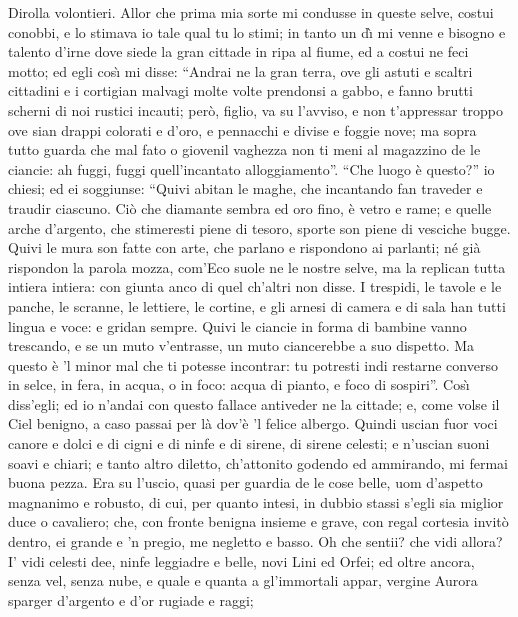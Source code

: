 \documentclass{book}
\begin{document}
	\5 Dirolla volontieri. Allor che prima
	mia sorte mi condusse in queste selve,
	costui conobbi, e lo stimava io tale
	qual tu lo stimi; in tanto un d\`{\i} mi venne
	e bisogno e talento d'irne dove
	siede la gran cittade in ripa al fiume,
	ed a costui ne feci motto; ed egli
	cos\`{\i} mi disse: ``Andrai ne la gran terra,
	ove gli astuti e scaltri cittadini
	e i cortigian malvagi molte volte
	prendonsi a gabbo, e fanno brutti scherni
	di noi rustici incauti; per\`o, figlio,
	va su l'avviso, e non t'appressar troppo
	ove sian drappi colorati e d'oro,
	e pennacchi e divise e foggie nove;
	ma sopra tutto guarda che mal fato
	o giovenil vaghezza non ti meni
	al magazzino de le ciancie: ah fuggi,
	fuggi quell'incantato alloggiamento''.
	``Che luogo \`e questo?'' io chiesi; ed ei soggiunse:
	``Quivi abitan le maghe, che incantando
	fan traveder e traudir ciascuno.
	Ci\`o che diamante sembra ed oro fino,
	\`e vetro e rame; e quelle arche d'argento,
	che stimeresti piene di tesoro,
	sporte son piene di vesciche bugge.
	Quivi le mura son fatte con arte,
	che parlano e rispondono ai parlanti;
	n\'e gi\`a rispondon la parola mozza,
	com'Eco suole ne le nostre selve,
	ma la replican tutta intiera intiera:
	con giunta anco di quel ch'altri non disse.
	I trespidi, le tavole e le panche,
	le scranne, le lettiere, le cortine,
	e gli arnesi di camera e di sala
	han tutti lingua e voce: e gridan sempre.
	Quivi le ciancie in forma di bambine
	vanno trescando, e se un muto v'entrasse,
	un muto ciancerebbe a suo dispetto.
	Ma questo \`e 'l minor mal che ti potesse
	incontrar: tu potresti indi restarne
	converso in selce, in fera, in acqua, o in foco:
	acqua di pianto, e foco di sospiri''.
	Cos\`{\i} diss'egli; ed io n'andai con questo
	fallace antiveder ne la cittade;
	e, come volse il Ciel benigno, a caso
	passai per l\`a dov'\`e 'l felice albergo.
	Quindi uscian fuor voci canore e dolci
	e di cigni e di ninfe e di sirene,
	di sirene celesti; e n'uscian suoni
	soavi e chiari; e tanto altro diletto,
	ch'attonito godendo ed ammirando,
	mi fermai buona pezza. Era su l'uscio,
	quasi per guardia de le cose belle,
	uom d'aspetto magnanimo e robusto,
	di cui, per quanto intesi, in dubbio stassi
	s'egli sia miglior duce o cavaliero;
	che, con fronte benigna insieme e grave,
	con regal cortesia invit\`o dentro,
	ei grande e 'n pregio, me negletto e basso.
	Oh che sentii? che vidi allora? I' vidi
	celesti dee, ninfe leggiadre e belle,
	novi Lini ed Orfei; ed oltre ancora,
	senza vel, senza nube, e quale e quanta
	a gl'immortali appar, vergine Aurora
	sparger d'argento e d'or rugiade e raggi;
\end{document}

